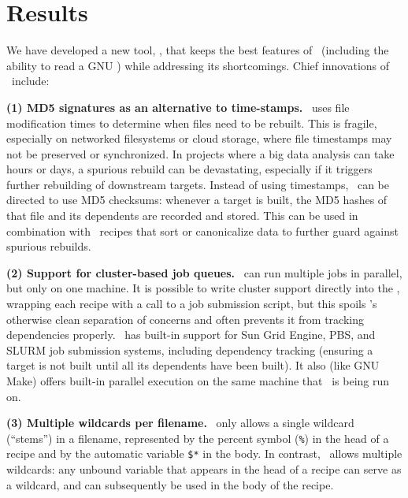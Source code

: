 \section*{Results}

We have developed a new tool, \biomake, that keeps the best features of \make\ (including the ability to read a GNU \Makefile) while addressing its shortcomings.
Chief innovations of \biomake\ include:

{\bf (1) MD5 signatures as an alternative to time-stamps.}
\make\ uses file modification times to determine when files need to be rebuilt.
This is fragile, especially on networked filesystems or cloud storage, where file timestamps may not be preserved or synchronized.
In projects where a big data analysis can take hours or days, a spurious rebuild can be devastating, especially if it triggers further rebuilding of downstream targets.
Instead of using timestamps, \biomake\ can be directed to use MD5 checksums: whenever a target is built, the MD5 hashes of that file and its dependents are recorded
and stored. This can be used in combination with \Makefile\ recipes that sort or canonicalize data to further guard against spurious rebuilds.

{\bf (2) Support for cluster-based job queues.}
\make\ can run multiple jobs in parallel, but only on one machine.
It is possible to write cluster support directly into the \Makefile,
wrapping each recipe with a call to a job submission script,
but this spoils \make's otherwise clean separation of concerns
and often prevents it from tracking dependencies properly.
\biomake\ has built-in support for Sun Grid Engine, PBS, and SLURM job submission systems,
including dependency tracking (ensuring a target is not built until all its dependents have been built).
It also (like GNU Make) offers built-in parallel execution on
the same machine that \biomake\ is being run on.

{\bf (3) Multiple wildcards per filename.}
\make\ only allows a single wildcard (``stems'') in a filename,
represented by the percent symbol ({\tt \%}) in the head of a recipe and by the automatic variable {\tt \$*} in the body.
In contrast, \biomake\ allows multiple wildcards: any unbound variable that appears in the head of a recipe can serve as a wildcard,
and can subsequently be used in the body of the recipe.



